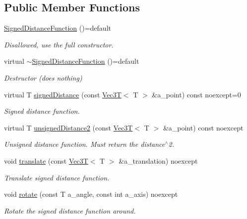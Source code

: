 \subsection*{Public Member Functions}
\begin{DoxyCompactItemize}
\item 
\mbox{\label{classSignedDistanceFunction_abfeeff9b3901e03ec6b73317dc9a722e}} 
\hyperlink{classSignedDistanceFunction_abfeeff9b3901e03ec6b73317dc9a722e}{Signed\+Distance\+Function} ()=default
\begin{DoxyCompactList}\small\item\em Disallowed, use the full constructor. \end{DoxyCompactList}\item 
\mbox{\label{classSignedDistanceFunction_ab47b289bd8351d7f323938c91b2bb92b}} 
virtual \hyperlink{classSignedDistanceFunction_ab47b289bd8351d7f323938c91b2bb92b}{$\sim$\+Signed\+Distance\+Function} ()=default
\begin{DoxyCompactList}\small\item\em Destructor (does nothing) \end{DoxyCompactList}\item 
virtual T \hyperlink{classSignedDistanceFunction_af5912280ca51dc21a2d6949a30ec7d21}{signed\+Distance} (const \hyperlink{classVec3T}{Vec3T}$<$ T $>$ \&a\+\_\+point) const noexcept=0
\begin{DoxyCompactList}\small\item\em Signed distance function. \end{DoxyCompactList}\item 
virtual T \hyperlink{classSignedDistanceFunction_a2a3e72186725a4e931db0f8d4895bcb8}{unsigned\+Distance2} (const \hyperlink{classVec3T}{Vec3T}$<$ T $>$ \&a\+\_\+point) const noexcept
\begin{DoxyCompactList}\small\item\em Unsigned distance function. Must return the distance$^\wedge$2. \end{DoxyCompactList}\item 
void \hyperlink{classSignedDistanceFunction_add71ebc2e7f3fb5e85766898413482e7}{translate} (const \hyperlink{classVec3T}{Vec3T}$<$ T $>$ \&a\+\_\+translation) noexcept
\begin{DoxyCompactList}\small\item\em Translate signed distance function. \end{DoxyCompactList}\item 
void \hyperlink{classSignedDistanceFunction_ae8de697f4d0966290342bcf6383585ef}{rotate} (const T a\+\_\+angle, const int a\+\_\+axis) noexcept
\begin{DoxyCompactList}\small\item\em Rotate the signed distance function around. \end{DoxyCompactList}\end{DoxyCompactItemize}
